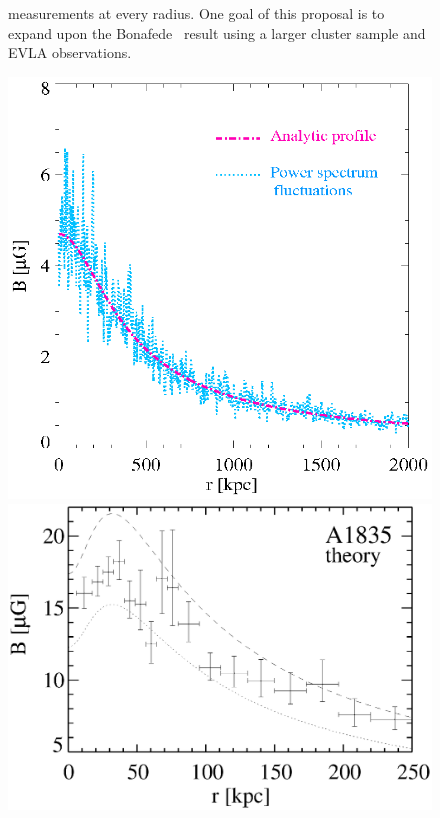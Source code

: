 \begin{figure}
\begin{center}
\begin{minipage}{0.495\linewidth}
{        measurements at every radius. One goal of this proposal is to
        expand upon the Bonafede \etal\ result using a larger cluster
        sample and EVLA observations.
        \label{fig:bonafede}}
    \end{minipage}
    \begin{minipage}{0.495\linewidth}
      \includegraphics*[width=\linewidth, trim=0mm 0mm 0mm 0mm, clip]{bonafede.ps}
    \end{minipage}
    \begin{minipage}{0.495\linewidth}
      \includegraphics*[width=\linewidth, trim=10mm 4mm 2mm 5mm, clip]{kunz.eps}

\end{minipage}
\end{center}
\end{figure}
